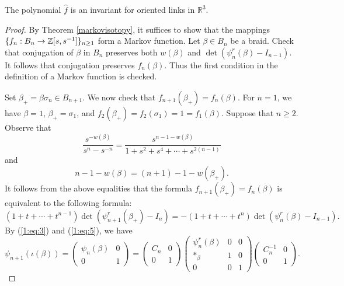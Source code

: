 \begin{theorem}
The polynomial $\hat{f}$ is an invariant for oriented links in $\mathbb{R}^3$.
\end{theorem}
  
\begin{proof}
  By Theorem \ref{markovisotopy}, it suffices to show that the mappings $\{f_n: B_n \to \mathbb{Z}[s, s^{-1}]\}_{n\geq 1}$ form a Markov function. Let $\beta \in B_n$ be a braid. Check that conjugation of $\beta$ in $B_n$ preserves both $w(\beta)$ and $\det(\psi_n^r (\beta) - I_{n-1})$. It follows that conjugation preserves $f_n(\beta)$. Thus the first condition in the definition of a Markov function is checked.
  
  Set $\beta_+ = \beta \sigma_n \in B_{n+1}$. We now check that $f_{n+1}(\beta_+) = f_n(\beta)$. For $n=1$, we have $\beta=1$, $\beta_+ = \sigma_1$, and $f_2(\beta_+) = f_2(\sigma_1) = 1 = f_1(\beta)$. Suppose that $n\geq 2$. Observe that 
\begin{displaymath}
\frac{s^{-w(\beta)}}{s^n - s^{-n}} = \frac{s^{n-1-w(\beta)}}{1+s^2 + s^4 + \cdots + s^{2(n-1)}}
\end{displaymath}
and 
\begin{displaymath}
n-1-w(\beta) = (n+1) - 1 - w(\beta_+).
\end{displaymath}
It follows from the above equalities that the formula $f_{n+1}(\beta_+) = f_n(\beta)$ is equivalent to the following formula: 
\begin{equation}
\label{eq:2}
(1+t+\cdots + t^{n-1})\det(\psi_{n+1}^r(\beta_+) - I_n) = -(1 + t + \cdots + t^n)\det(\psi_n^r (\beta) - I_{n-1}).
\end{equation}
By (\ref{1:eq:3}) and (\ref{1:eq:5}), we have 
\begin{displaymath}
\psi_{n+1}(\iota(\beta)) = \begin{pmatrix} \psi_n(\beta) & 0 \\ 0 & 1 \end{pmatrix} = \begin{pmatrix} C_n & 0 \\ 0 & 1 \end{pmatrix} \begin{pmatrix} \psi_n^r(\beta) & 0 & 0 \\ *_{\beta} & 1 & 0 \\ 0 & 0 & 1\end{pmatrix} \begin{pmatrix} C_n^{-1} & 0 \\ 0 & 1 \end{pmatrix}.

\end{displaymath}
\end{proof}
